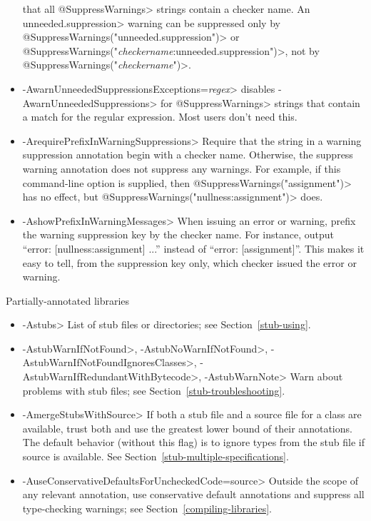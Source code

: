 \begin{itemize}
  that all \<@SuppressWarnings> strings contain a checker name.
  An \<unneeded.suppression> warning can be suppressed only by
  \<@SuppressWarnings("unneeded.suppression")>
  or \<@SuppressWarnings("\emph{checkername}:unneeded.suppression")>,
  not by \<@SuppressWarnings("\emph{checkername}")>.
\item \<-AwarnUnneededSuppressionsExceptions=\emph{regex}> disables
  \<-AwarnUnneededSuppressions> for \<@SuppressWarnings> strings that
  contain a match for the regular expression.  Most users don't need this.
\item \<-ArequirePrefixInWarningSuppressions>
  Require that the string in a warning suppression annotation begin with a checker
  name.  Otherwise, the suppress warning annotation does not
  suppress any warnings.  For example, if this command-line option is
  supplied, then \<@SuppressWarnings("assignment")> has no effect, but
  \<@SuppressWarnings("nullness:assignment")> does.
\item \<-AshowPrefixInWarningMessages>
  When issuing an error or warning, prefix the warning suppression key by
  the checker name.  For instance, output ``error: [nullness:assignment]
  ...'' instead of ``error: [assignment]''.  This makes it easy to tell,
  from the suppression key only, which checker issued the error or warning.
\end{itemize}

Partially-annotated libraries
\begin{itemize}


\item \<-Astubs>
  List of stub files or directories; see Section~\ref{stub-using}.

\item
  \<-AstubWarnIfNotFound>,
  \<-AstubNoWarnIfNotFound>,
  \<-AstubWarnIfNotFoundIgnoresClasses>,
  \<-AstubWarnIfRedundantWithBytecode>,
  \<-AstubWarnNote>
  Warn about problems with stub files; see Section~\ref{stub-troubleshooting}.

\item \<-AmergeStubsWithSource>
  If both a stub file and a source file for a class are available, trust
  both and use the greatest lower bound of their annotations. The default
  behavior (without this flag) is to ignore types from the stub file if
  source is available. See Section~\ref{stub-multiple-specifications}.

\item \<-AuseConservativeDefaultsForUncheckedCode=source>
  Outside the scope of any relevant
   annotation, use conservative
  default annotations and suppress all type-checking warnings; see
  Section~\ref{compiling-libraries}.

\end{itemize}

